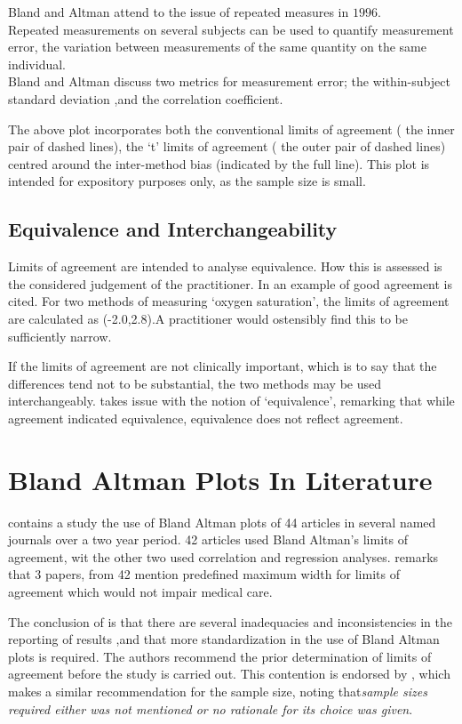 \documentclass[12pt, a4paper]{report}
\begin{document}
Bland and Altman attend to the issue of repeated measures in
$1996$.
\\
Repeated measurements on several subjects can be used to quantify
measurement error, the variation between measurements of the same
quantity on the same individual.
\\
Bland and Altman discuss two metrics for measurement error; the
within-subject standard deviation ,and the correlation
coefficient.

The above plot incorporates both the conventional limits of
agreement ( the inner pair of dashed lines), the `t' limits of
agreement ( the outer pair of dashed lines) centred around the
inter-method bias (indicated by the full line). This plot is
intended for expository purposes only, as the sample size is
small.





\subsection{Equivalence and Interchangeability}
Limits of agreement are intended to analyse equivalence. How this
is assessed is the considered judgement of the practitioner. In
\citet{BA86} an example of good agreement is cited. For two
methods of measuring `oxygen saturation', the limits of agreement
are calculated as (-2.0,2.8).A practitioner would ostensibly find
this to be sufficiently narrow.

If the limits of agreement are not clinically important, which is
to say that the differences tend not to be substantial, the two
methods may be used interchangeably. \citet{DunnSEME} takes issue
with the notion of `equivalence', remarking that while agreement
indicated equivalence, equivalence does not reflect agreement.




\section{Bland Altman Plots In Literature}
\citet{mantha} contains a study the use of Bland Altman plots of
44 articles in several named journals over a two year period. 42
articles used Bland Altman's limits of agreement, wit the other
two used correlation and regression analyses. \citet{mantha}
remarks that 3 papers, from 42 mention predefined maximum width
for limits of agreement which would not impair medical care.

The conclusion of \citet{mantha} is that there are several
inadequacies and inconsistencies in the reporting of results ,and
that more standardization in the use of Bland Altman plots is
required. The authors recommend the prior determination of limits
of agreement before the study is carried out. This contention is
endorsed by \citet{lin}, which makes a similar recommendation for
the sample size, noting that\emph{sample sizes required either was
not mentioned or no rationale for its choice was given}.
\end{document}
